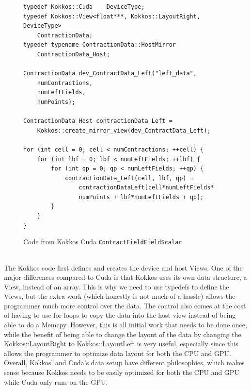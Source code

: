 \begin{figure}[!htb]
	\begin{lstlisting}
typedef Kokkos::Cuda	DeviceType;
typedef Kokkos::View<float***, Kokkos::LayoutRight, DeviceType>
	ContractionData;
typedef typename ContractionData::HostMirror
	ContractionData_Host;

ContractionData dev_ContractData_Left("left_data",
	numContractions,
	numLeftFields,
	numPoints);

ContractionData_Host contractionData_Left = 
	Kokkos::create_mirror_view(dev_ContractData_Left);

for (int cell = 0; cell < numContractions; ++cell) {
	for (int lbf = 0; lbf < numLeftFields; ++lbf) {
		for (int qp = 0; qp < numLeftFields; ++qp) {
			contractionData_Left(cell, lbf, qp) = 
				contractionDataLeft[cell*numLeftFields*
				numPoints + lbf*numLeftFields + qp];
		}
	}
}
	\end{lstlisting}
\caption{Code from Kokkos Cuda \texttt{ContractFieldFieldScalar}
\label{lst:ContractFieldFieldScalar Kokkos Cuda Data Setup}}
\end{figure}
\\
The Kokkos code first defines and creates the device and host Views. One of the
major differences compared to Cuda is that Kokkos uses its own data structure,
a View, instead of an array. This is why we need to use typedefs to define the
Views, but the extra work (which honestly is not much of a hassle) allows the
programmer much more control over the data. The control also comes at the cost
of having to use for loops to copy the data into the host view instead of being
able to do a Memcpy. However, this is all initial work that needs to be done
once, while the benefit of being able to change the layout of the data by
changing the Kokkos::LayoutRight to Kokkos::LayoutLeft is very useful,
especially since this allows the programmer to optimize data layout for both
the CPU and GPU. Overall, Kokkos' and Cuda's data setup have different
philosophies, which makes sense because Kokkos needs to be easily optimized for
both the CPU and GPU while Cuda only runs on the GPU. 

